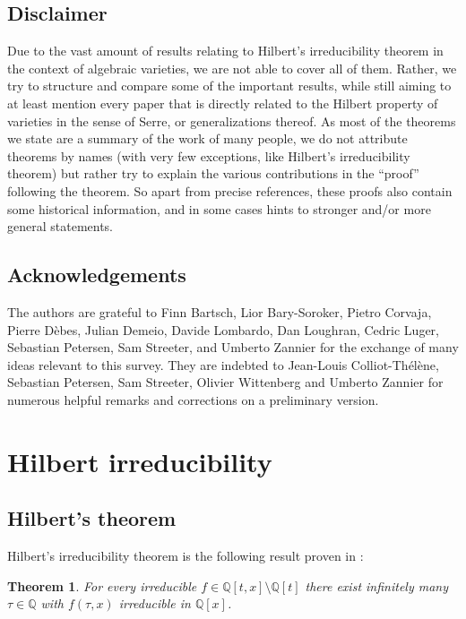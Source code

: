 \documentclass[10pt,a4paper]{amsart}
\theoremstyle{plain}
\newtheorem{theorem}{Theorem}
\theoremstyle{remark}
\numberwithin{theorem}{section}
\begin{document}
\subsection*{Disclaimer}
Due to the vast amount of results relating to   Hilbert's irreducibility theorem in the context of algebraic varieties, we are not able to cover all of them.
Rather, we try to structure and compare some of the important results,
while still aiming to at least mention every paper that is directly related to the Hilbert property of varieties in the sense of Serre, or generalizations thereof.
As most of the theorems we state are a summary of the work of many people, we do not attribute theorems by names (with very few exceptions, like Hilbert's irreducibility theorem) but rather try to explain the various contributions in the ``proof'' following the theorem.
So apart from precise references, these proofs also contain some historical information, and in some cases hints to stronger and/or more general statements.

\subsection*{Acknowledgements} 
The authors are grateful to
Finn Bartsch,
Lior Bary-Soroker,
Pietro Corvaja, 
Pierre D\`ebes,
Julian Demeio, 
Davide Lombardo,
Dan Loughran,
Cedric Luger,
Sebastian Petersen,
Sam Streeter,
and Umberto Zannier 
for the exchange of many ideas relevant to this survey.
They are indebted to Jean-Louis Colliot-Th\'el\`ene, Sebastian Petersen, Sam Streeter, Olivier Wittenberg and Umberto Zannier for numerous helpful remarks and corrections on a preliminary version.



\section{Hilbert irreducibility} 
\label{sec:one}

\subsection{Hilbert's theorem}
\label{sec:HIT}

Hilbert's irreducibility theorem is the following result proven in \cite[Theorem~I]{Hilbert}:

\begin{theorem}\label{thm:Hilbert}
For every irreducible $f\in \mathbb{Q}[t,x]\setminus\mathbb{Q}[t]$ there exist infinitely many
$\tau\in\mathbb{Q}$ with $f(\tau,x)$ irreducible in $\mathbb{Q}[x]$.
\end{theorem}
\end{document}
